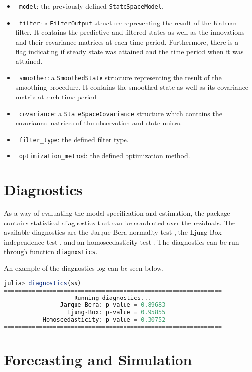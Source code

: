 \documentclass{juliacon}
\begin{document}
\begin{itemize}
    \item ~\texttt{model}: the previously defined \texttt{StateSpaceModel}.
    \item ~\texttt{filter}: a \texttt{FilterOutput} structure representing the result of the Kalman filter. It contains the predictive and filtered states as well as the innovations and their covariance matrices at each time period. Furthermore, there is a flag indicating if steady state was attained and the time period when it was attained.
    \item ~\texttt{smoother}: a \texttt{SmoothedState} structure representing the result of the smoothing procedure. It contains the smoothed state as well as its covariance matrix at each time period.
    \item ~\texttt{covariance}: a \texttt{StateSpaceCovariance} structure which contains the covariance matrices of the observation and state noises.
    \item ~\texttt{filter\_type}: the defined filter type.
    \item ~\texttt{optimization\_method}: the defined optimization method.
\end{itemize}

\section{Diagnostics} \label{sec:diagnostics}

As a way of evaluating the model specification and estimation, the package contains statistical diagnostics that can be conducted over the residuals. The available diagnostics are the Jarque-Bera normality test \cite{jarque1980efficient}, the Ljung-Box independence test \cite{box1970distribution}, and an homoscedasticity test \cite{durbin2012time}. The diagnostics can be run through function \texttt{diagnostics}.

An example of the diagnostics log can be seen below.
%
\begin{lstlisting}[language = Julia]
julia> diagnostics(ss)
==============================================================
                    Running diagnostics...
                Jarque-Bera: p-value = 0.89683
                  Ljung-Box: p-value = 0.95855
           Homoscedasticity: p-value = 0.30752
==============================================================
\end{lstlisting}

\section{Forecasting and Simulation} \label{sec:forecasting}
\end{document}
